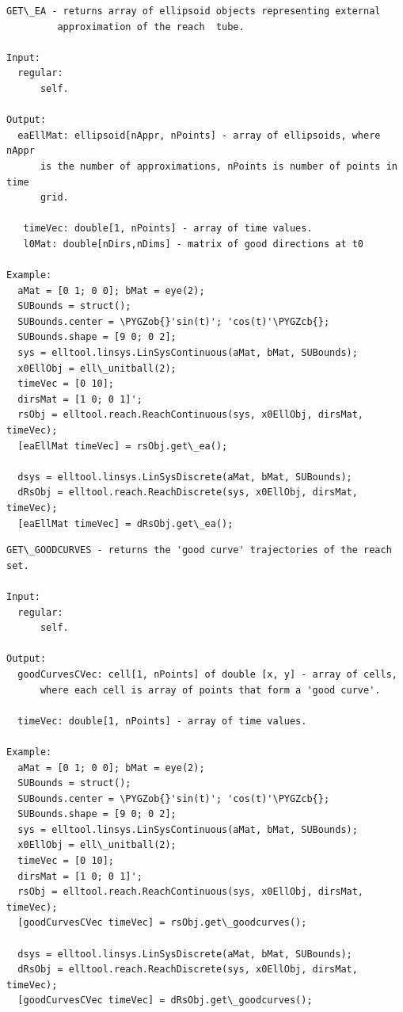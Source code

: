 \documentclass[letterpaper,10pt,english]{sphinxmanual}
\def\PYGZob{\char`\{}
\def\PYGZcb{\char`\}}
\begin{document}
\begin{Verbatim}[commandchars=\\\{\}]
GET\_EA - returns array of ellipsoid objects representing external
         approximation of the reach  tube.

Input:
  regular:
      self.

Output:
  eaEllMat: ellipsoid[nAppr, nPoints] - array of ellipsoids, where nAppr
      is the number of approximations, nPoints is number of points in time
      grid.

   timeVec: double[1, nPoints] - array of time values.
   l0Mat: double[nDirs,nDims] - matrix of good directions at t0

Example:
  aMat = [0 1; 0 0]; bMat = eye(2);
  SUBounds = struct();
  SUBounds.center = \PYGZob{}'sin(t)'; 'cos(t)'\PYGZcb{};
  SUBounds.shape = [9 0; 0 2];
  sys = elltool.linsys.LinSysContinuous(aMat, bMat, SUBounds);
  x0EllObj = ell\_unitball(2);
  timeVec = [0 10];
  dirsMat = [1 0; 0 1]';
  rsObj = elltool.reach.ReachContinuous(sys, x0EllObj, dirsMat, timeVec);
  [eaEllMat timeVec] = rsObj.get\_ea();

  dsys = elltool.linsys.LinSysDiscrete(aMat, bMat, SUBounds);
  dRsObj = elltool.reach.ReachDiscrete(sys, x0EllObj, dirsMat, timeVec);
  [eaEllMat timeVec] = dRsObj.get\_ea();
\end{Verbatim}
\label{chap_func:elltool-reach-areach-get-goodcurves}
\begin{Verbatim}[commandchars=\\\{\}]
GET\_GOODCURVES - returns the 'good curve' trajectories of the reach set.

Input:
  regular:
      self.

Output:
  goodCurvesCVec: cell[1, nPoints] of double [x, y] - array of cells,
      where each cell is array of points that form a 'good curve'.

  timeVec: double[1, nPoints] - array of time values.

Example:
  aMat = [0 1; 0 0]; bMat = eye(2);
  SUBounds = struct();
  SUBounds.center = \PYGZob{}'sin(t)'; 'cos(t)'\PYGZcb{};
  SUBounds.shape = [9 0; 0 2];
  sys = elltool.linsys.LinSysContinuous(aMat, bMat, SUBounds);
  x0EllObj = ell\_unitball(2);
  timeVec = [0 10];
  dirsMat = [1 0; 0 1]';
  rsObj = elltool.reach.ReachContinuous(sys, x0EllObj, dirsMat, timeVec);
  [goodCurvesCVec timeVec] = rsObj.get\_goodcurves();

  dsys = elltool.linsys.LinSysDiscrete(aMat, bMat, SUBounds);
  dRsObj = elltool.reach.ReachDiscrete(sys, x0EllObj, dirsMat, timeVec);
  [goodCurvesCVec timeVec] = dRsObj.get\_goodcurves();
\end{Verbatim}
\end{document}
